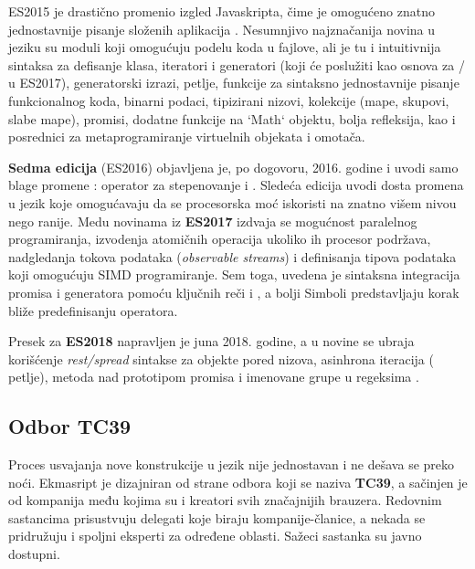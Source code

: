 ES2015 je drastično promenio izgled Javaskripta, čime je omogućeno znatno jednostavnije pisanje složenih aplikacija \cite{axel-rauschmayer:es6}.
Nesumnjivo najznačanija novina u jeziku su moduli koji omogućuju podelu koda u fajlove, ali je tu i intuitivnija sintaksa za defisanje klasa, iteratori i generatori (koji će poslužiti kao osnova za / u ES2017), generatorski izrazi,  petlje,  funkcije za sintaksno jednostavnije pisanje funkcionalnog koda, binarni podaci, tipizirani nizovi, kolekcije (mape, skupovi, slabe mape), promisi, dodatne funkcije na `Math` objektu, bolja refleksija, kao i posrednici za metaprogramiranje virtuelnih objekata i omotača.

\textbf{Sedma edicija} (ES2016) objavljena je, po dogovoru, 2016. godine i uvodi samo blage promene \cite{axel-rauschmayer:es2016:es2017}: operator za stepenovanje \code{**} i . Sledeća edicija uvodi dosta promena u jezik koje omogućavaju da se procesorska moć iskoristi na znatno višem nivou nego ranije. Medu novinama iz \textbf{ES2017} izdvaja se mogućnost paralelnog programiranja, izvodenja atomičnih operacija ukoliko ih procesor podržava, nadgledanja tokova podataka (\textsl{observable streams}) i definisanja tipova podataka koji omogućuju SIMD programiranje. Sem toga, uvedena je sintaksna integracija promisa i generatora pomoću ključnih reči  i , a bolji Simboli predstavljaju korak bliže predefinisanju operatora.

Presek za \textbf{ES2018} napravljen je juna 2018. godine, a u novine se ubraja korišćenje \textsl{rest/spread} sintakse za objekte pored nizova, asinhrona iteracija ( petlje), metoda  nad prototipom promisa i imenovane grupe u regeksima \cite{axel-rauschmayer:es2018:es2019}.

\subsection{Odbor TC39}

Proces usvajanja nove konstrukcije u jezik nije jednostavan i ne dešava se preko noći.
Ekmasript je dizajniran od strane odbora koji se naziva \textbf{TC39}, a sačinjen je od kompanija među kojima su i kreatori svih značajnijih brauzera.
Redovnim sastancima prisustvuju delegati koje biraju kompanije-članice, a nekada se pridružuju i spoljni eksperti za određene oblasti.
Sažeci sastanka su javno dostupni.


